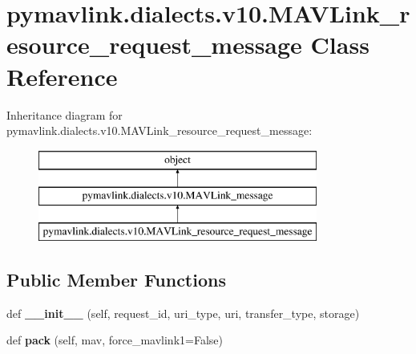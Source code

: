 \hypertarget{classpymavlink_1_1dialects_1_1v10_1_1MAVLink__resource__request__message}{}\section{pymavlink.\+dialects.\+v10.\+M\+A\+V\+Link\+\_\+resource\+\_\+request\+\_\+message Class Reference}
\label{classpymavlink_1_1dialects_1_1v10_1_1MAVLink__resource__request__message}
Inheritance diagram for pymavlink.\+dialects.\+v10.\+M\+A\+V\+Link\+\_\+resource\+\_\+request\+\_\+message\+:\begin{figure}[H]
\begin{center}
\leavevmode
\includegraphics[height=3.000000cm]{classpymavlink_1_1dialects_1_1v10_1_1MAVLink__resource__request__message}
\end{center}
\end{figure}
\subsection*{Public Member Functions}
\begin{DoxyCompactItemize}
\item 
\mbox{\label{classpymavlink_1_1dialects_1_1v10_1_1MAVLink__resource__request__message_a160f9a0bbd0482307de5d3224a8ec712}} 
def {\bfseries \+\_\+\+\_\+init\+\_\+\+\_\+} (self, request\+\_\+id, uri\+\_\+type, uri, transfer\+\_\+type, storage)
\item 
\mbox{\label{classpymavlink_1_1dialects_1_1v10_1_1MAVLink__resource__request__message_ab62d65fb7a30be0f451ce4c4c2ba236c}} 
def {\bfseries pack} (self, mav, force\+\_\+mavlink1=False)
\end{DoxyCompactItemize}
